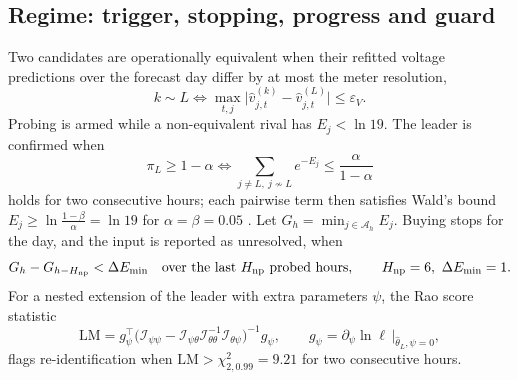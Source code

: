 \documentclass[journal,onecolumn,11pt]{IEEEtran}
\newcommand{\tp}{^{\top}}
\begin{document}
\subsection{Regime: trigger, stopping, progress and guard}
Two candidates are operationally equivalent when their refitted voltage predictions over the forecast day differ by at most the meter resolution,
\begin{equation}\label{eq:equiv}
k\sim L\iff\max_{t,j}\big|\hat v^{(k)}_{j,t}-\hat v^{(L)}_{j,t}\big|\le\varepsilon_V .
\end{equation}
Probing is armed while a non-equivalent rival has $E_j<\ln19$. The leader is confirmed when
\begin{equation}\label{eq:stop}
\pi_L\ge1-\alpha\iff\sum_{j\ne L,\ j\nsim L}e^{-E_j}\le\frac{\alpha}{1-\alpha}
\end{equation}
holds for two consecutive hours; each pairwise term then satisfies Wald's bound $E_j\ge\ln\frac{1-\beta}{\alpha}=\ln19$ for $\alpha=\beta=0.05$ \cite{wald1945}. Let $G_h=\min_{j\in\mathcal A_h}E_j$. Buying stops for the day, and the input is reported as unresolved, when
\begin{equation}\label{eq:noprog}
G_h-G_{h-H_{\rm np}}<\Delta E_{\min}\quad\text{over the last } H_{\rm np} \text{ probed hours},\qquad H_{\rm np}=6,\ \Delta E_{\min}=1.
\end{equation}
For a nested extension of the leader with extra parameters $\psi$, the Rao score statistic \cite{rao1948}
\begin{equation}\label{eq:lm}
\mathrm{LM}=g_\psi\tp\big(\mathcal I_{\psi\psi}-\mathcal I_{\psi\theta}\mathcal I_{\theta\theta}^{-1}\mathcal I_{\theta\psi}\big)^{-1}g_\psi,\qquad g_\psi=\partial_\psi\ln\ell\,\big|_{\hat\theta_L,\psi=0},
\end{equation}
flags re-identification when $\mathrm{LM}>\chi^2_{2,0.99}=9.21$ for two consecutive hours.
\end{document}
